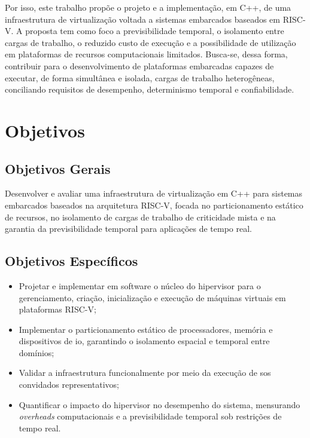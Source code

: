 Por isso, este trabalho propõe o projeto e a implementação, em C++, de uma infraestrutura de virtualização voltada a sistemas embarcados
baseados em RISC-V. A proposta tem como foco a previsibilidade temporal, o isolamento entre cargas de trabalho, o reduzido custo de execução e a possibilidade de utilização em plataformas de recursos
computacionais limitados. Busca-se, dessa forma, contribuir para o desenvolvimento de plataformas embarcadas capazes de executar, de forma simultânea e isolada, cargas de trabalho heterogêneas,
conciliando requisitos de desempenho, determinismo temporal e confiabilidade.

\section{Objetivos}

\subsection{Objetivos Gerais}

Desenvolver e avaliar uma infraestrutura de virtualização em C++ para sistemas embarcados baseados na arquitetura RISC-V,
focada no particionamento estático de recursos, no isolamento de cargas de trabalho de criticidade mista e na garantia da previsibilidade temporal para aplicações de tempo real.

\subsection{Objetivos Específicos}

\begin{itemize}
    \item Projetar e implementar em software o núcleo do hipervisor para o gerenciamento, criação, inicialização e execução de máquinas virtuais em plataformas RISC-V\@;
    \item Implementar o particionamento estático de processadores, memória e dispositivos de \gls{io}, garantindo o isolamento espacial e temporal entre domínios;
	\item Validar a infraestrutura funcionalmente por meio da execução de \glspl{so} convidados representativos;
	\item Quantificar o impacto do hipervisor no desempenho do sistema, mensurando \textit{overheads} computacionais e a previsibilidade temporal sob restrições de tempo real.
\end{itemize}





